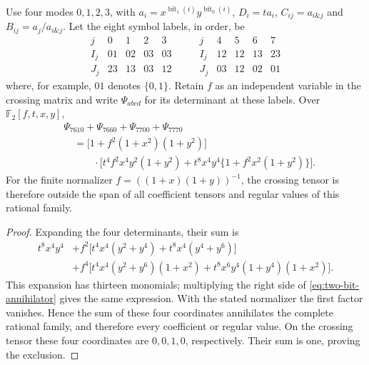 \begin{proposition}\label{prop:finite-two-bit}
Use four modes $0,1,2,3$, with
$a_i=x^{\operatorname{bit}_1(i)}y^{\operatorname{bit}_0(i)}$,
$D_i=ta_i$, $C_{ij}=a_{i\mathbin{\&}j}$ and
$B_{ij}=a_j/a_{i\mathbin{\&}j}$. Let the eight symbol labels, in order, be
\[
\begin{array}{c|cccc}
 j&0&1&2&3\\\hline
 I_j&01&02&03&03\\
 J_j&23&13&03&12
\end{array}
\qquad
\begin{array}{c|cccc}
 j&4&5&6&7\\\hline
 I_j&12&12&13&23\\
 J_j&03&12&02&01
\end{array}
\]
where, for example, $01$ denotes $\{0,1\}$. Retain $f$ as an independent variable in the crossing matrix and write $\Psi_{abcd}$ for its determinant at these labels. Over $\mathbb F_2[f,t,x,y]$,
\begin{align}\label{eq:two-bit-annihilator}
 &\Psi_{7610}+\Psi_{7660}+\Psi_{7700}+\Psi_{7770}\nonumber\\
 &\quad=\bigl[1+f^2(1+x^2)(1+y^2)\bigr]\nonumber\\
 &\qquad\quad\cdot\bigl[t^4f^2x^4y^2(1+y^2)
       +t^8x^4y^4\{1+f^2x^2(1+y^2)\}\bigr].
\end{align}
For the finite normalizer $f=((1+x)(1+y))^{-1}$, the crossing tensor is therefore outside the span of all coefficient tensors and regular values of this rational family.
\end{proposition}
\begin{proof}
Expanding the four determinants, their sum is
\begin{align*}
 t^8x^4y^4
 &+f^2\bigl[t^4x^4(y^2+y^4)+t^8x^4(y^4+y^6)\bigr]\\
 &+f^4\bigl[t^4x^4(y^2+y^6)(1+x^2)
             +t^8x^6y^4(1+y^4)(1+x^2)\bigr].
\end{align*}
This expansion has thirteen monomials; multiplying the right side of \eqref{eq:two-bit-annihilator} gives the same expression. With the stated normalizer the first factor vanishes. Hence the sum of these four coordinates annihilates the complete rational family, and therefore every coefficient or regular value. On the crossing tensor these four coordinates are $0,0,1,0$, respectively. Their sum is one, proving the exclusion.
\end{proof}

